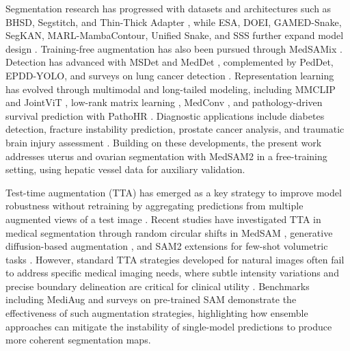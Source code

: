 \documentclass{article}
\begin{document}
Segmentation research has progressed with datasets and architectures such as BHSD, Segstitch, and Thin-Thick Adapter \cite{wu2023bhsd,tan2024segstitch,zhang2023thin}, while ESA, DOEI, GAMED-Snake, SegKAN, MARL-MambaContour, Unified Snake, and SSS further expand model design \cite{ge2025esa,zhu2025doei,zhang2025gamed,tan2024segkan,zhang2025marl,zhang2025unified,zhu2025sss}. Training-free augmentation has also been pursued through MedSAMix \cite{yang2025medsamix}. Detection has advanced with MSDet and MedDet \cite{cai2024msdet,zhang2024meddet}, complemented by PedDet, EPDD-YOLO, and surveys on lung cancer detection \cite{zhao2025peddet,luo2025epdd,cai2025medical}. Representation learning has evolved through multimodal and long-tailed modeling, including MMCLIP and JointViT \cite{wu2024mmclip,zhang2024jointvit}, low-rank matrix learning \cite{ji2024efficient}, MedConv \cite{qi2025medconv}, and pathology-driven survival prediction with PathoHR \cite{luo2025pathohr}. Diagnostic applications include diabetes detection, fracture instability prediction, prostate cancer analysis, and traumatic brain injury assessment \cite{zhang2024deep,zhao2024landmark,qi2025projectedex,hiwase2025can}. Building on these developments, the present work addresses uterus and ovarian segmentation with MedSAM2 \cite{ma2025medsam2} in a free-training setting, using hepatic vessel data for auxiliary validation.

Test-time augmentation (TTA) has emerged as a key strategy to improve model robustness without retraining by aggregating predictions from multiple augmented views of a test image \cite{ma2024test}. Recent studies have investigated TTA in medical segmentation through random circular shifts in MedSAM \cite{nazzal2024improving}, generative diffusion-based augmentation \cite{ma2024test}, and SAM2 extensions for few-shot volumetric tasks \cite{zu2025rethinking}. However, standard TTA strategies developed for natural images often fail to address specific medical imaging needs, where subtle intensity variations and precise boundary delineation are critical for clinical utility \cite{nazzal2024improving}. Benchmarks including MediAug \cite{qi2025mediaug} and surveys on pre-trained SAM \cite{wu2025pre} demonstrate the effectiveness of such augmentation strategies, highlighting how ensemble approaches can mitigate the instability of single-model predictions to produce more coherent segmentation maps.
\end{document}
